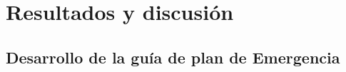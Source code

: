     
    
    
    
    \section{Resultados y discusión}
    
    \subsection{Desarrollo de la guía de plan de Emergencia}
    

